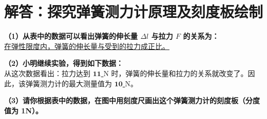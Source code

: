 \documentclass[12pt, a4paper]{ctexrep}
\begin{document}

\section{解答：探究弹簧测力计原理及刻度板绘制}

\vspace{0.6cm}

\textbf{（1）从表中的数据可以看出弹簧的伸长量 $\Delta l$ 与拉力 $F$ 的关系为：}\\
\underline{\quad 在弹性限度内，弹簧的伸长量与受到的拉力成正比。\quad}

\vspace{0.4cm}

\textbf{（2）小明继续实验，得到如下数据：} \\
从这次数据看出：拉力达到 \underline{\quad $\textbf{11}$ \quad} N 时，弹簧的伸长量和拉力的关系就改变了。因此，该弹簧测力计的最大测量值为 \underline{\quad $\textbf{10}$ \quad} N。

\vspace{0.4cm}

\textbf{（3）请你根据表中的数据，在图中用刻度尺画出这个弹簧测力计的刻度板（分度值为 1N）。}

\vspace{0.4cm}
\end{document}
